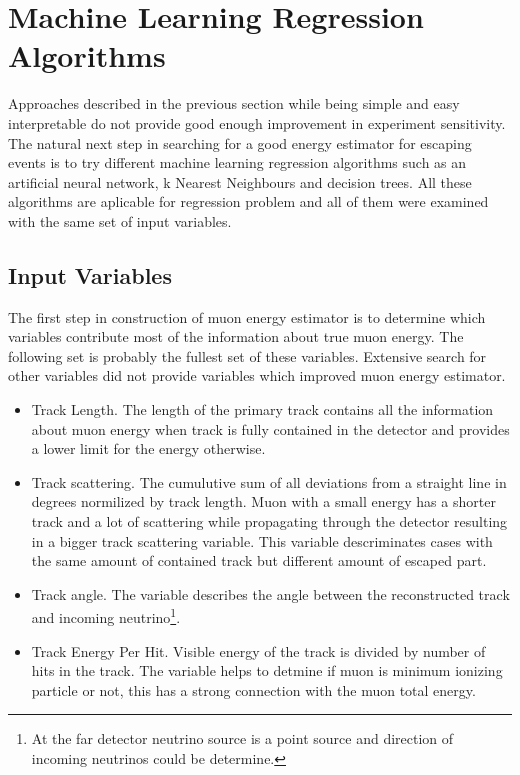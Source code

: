 \section{Machine Learning Regression Algorithms}
Approaches described in the previous section while being simple and easy interpretable do
not provide good enough improvement in experiment sensitivity. The natural next step in
searching for a good energy estimator for escaping events is to try different machine 
learning regression algorithms such as an artificial neural network, k Nearest Neighbours and
decision trees. All these algorithms are aplicable for regression problem and all of them 
were examined with the same set of input variables.

\subsection{Input Variables}
The first step in construction of muon energy estimator is to determine which variables 
contribute most of the information about true muon energy. The following set is probably
the fullest set of these variables. Extensive search for other variables did not provide 
variables which improved muon energy estimator.
\begin{itemize}
\item Track Length. The length of the primary track contains all the information about muon
energy when track is fully contained in the detector and provides a lower limit for the 
energy otherwise.
\item Track scattering. The cumulutive sum of all deviations from a straight line in degrees
normilized by track length. Muon with a small energy has a shorter track and a lot of scattering 
while propagating through the detector resulting in a bigger track scattering variable. 
This variable descriminates cases with the same amount of contained track but different amount
of escaped part.
\item Track angle. The variable describes the angle between the reconstructed track and 
incoming neutrino\footnote{At the far detector neutrino source is a point source and direction
of incoming neutrinos could be determine.}. 
\item Track Energy Per Hit. Visible energy of the track is divided by number of hits in the 
track. The variable helps to detmine if muon is minimum ionizing particle or not, this has
a strong connection with the muon total energy.
\end{itemize}

